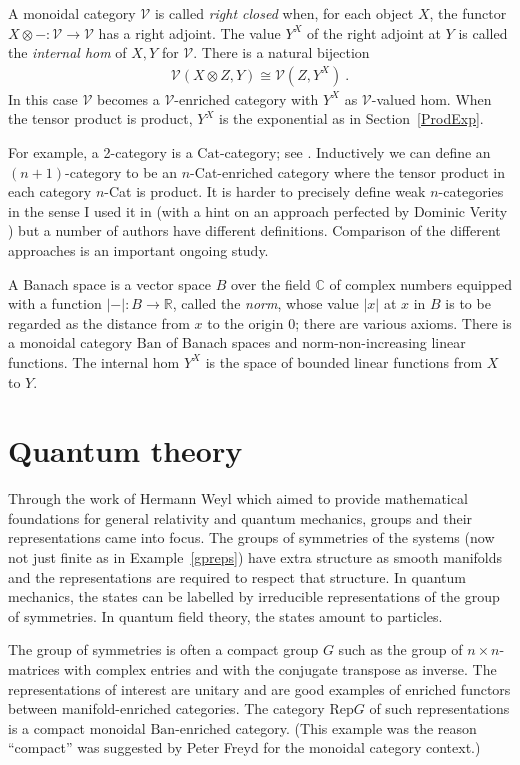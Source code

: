 \documentclass[a4paper,12pt]{article}
\theoremstyle{step}
\def\CV{{\mathscr V}}
\def\ot{{\otimes}}
\begin{document}
A monoidal category $\CV$ is called {\em right closed} when, for each object $X$, the functor
$X\ot - : \CV\to \CV$ has a right adjoint. The value $Y^X$ of the right adjoint at $Y$ is
called the {\em internal hom} of $X, Y$ for $\CV$. There is a natural bijection
\begin{eqnarray*}
\CV(X\ot Z, Y) \cong \CV(Z, Y^X) \ . 
\end{eqnarray*}
In this case $\CV$ becomes a $\CV$-enriched category with $Y^X$ as $\CV$-valued hom. When the tensor product is product, $Y^X$ is the exponential as in Section~\ref{ProdExp}. 

For example, a 2-category is a $\mathrm{Cat}$-category; see \cite{EilKel1966, KelBk}.
Inductively we can define an {$(n+1)$-category} to be an $n$-Cat-enriched category
where the tensor product in each category $n$-Cat is product. It is harder to 
precisely define weak $n$-categories in the sense I used it in \cite{30} (with a hint on
an approach perfected by Dominic Verity \cite{Ver}) but a number of authors have 
different definitions. Comparison of the different approaches is an important ongoing study.

A Banach space is a vector space $B$ over the field $\mathbb{C}$ of complex numbers equipped with a function $\lvert-\rvert : B\to \mathbb{R}$, called the {\em norm}, whose value $\lvert x\rvert$
at $x$ in $B$ is to be regarded as the distance from $x$ to the origin $0$; there are various
axioms. There is a monoidal category $\mathrm{Ban}$ of Banach spaces and norm-non-increasing linear functions. The internal hom $Y^X$ is the space of bounded linear functions from $X$ to $Y$.    

\section{Quantum theory}\label{Qt}

Through the work of Hermann Weyl \cite{Wey1918, Wey1927} which aimed to provide 
mathematical foundations for general relativity and quantum mechanics, groups and their representations came into focus. The groups of symmetries of the systems 
(now not just finite as in Example~\ref{gpreps}) have extra structure as smooth manifolds
 and the representations are required to respect that structure. 
In quantum mechanics, the states can be labelled by irreducible representations of the group of symmetries. 
In quantum field theory, the states amount to particles. 

The group of symmetries is often a compact group $G$ such as the group of $n \times n$-matrices with complex entries and with the conjugate transpose as inverse.
The representations of interest are unitary and are good examples of enriched functors
between manifold-enriched categories. 
The category $\mathrm{Rep}G$ of such representations is a compact monoidal $\mathrm{Ban}$-enriched category. (This example was the reason ``compact''
was suggested by Peter Freyd for the monoidal category context.) 
 
\end{document}
